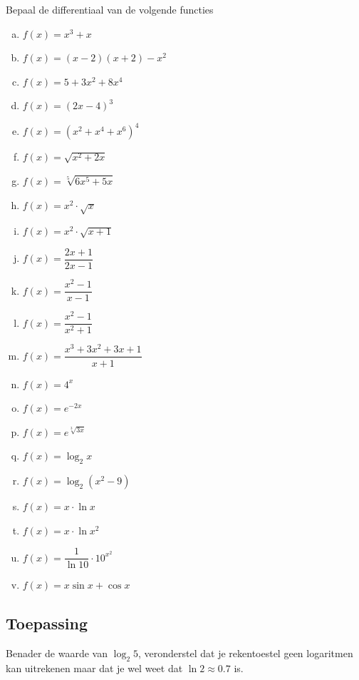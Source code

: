 \documentclass[a4paper,12pt, twoside]{article}
\begin{document}
\begin{oefening}
Bepaal de differentiaal van de volgende functies
\begin{multicols}{2}
\begin{enumerate}[(a)]
  \itemsep.5em
  \item $\displaystyle f(x)=x^3+x$
  \item $\displaystyle f(x)=(x-2)(x+2)-x^2$
  \item $\displaystyle f(x)=5+3x^2+8x^4$
  \item $\displaystyle f(x)=\left(2x-4\right)^3$
  \item $\displaystyle f(x)=\left(x^2+x^4+x^6\right)^4$
  \item $\displaystyle f(x)=\sqrt{x^2+2x}$
  \item $\displaystyle f(x)=\sqrt[5]{6x^5+5x}$
  \item $\displaystyle f(x)=x^2\cdot\sqrt{x}$
  \item $\displaystyle f(x)=x^2\cdot\sqrt{x+1}$
  \item $\displaystyle f(x)=\dfrac{2x+1}{2x-1}$
  \item $\displaystyle f(x)=\dfrac{x^2-1}{x-1}$
  \item $\displaystyle f(x)=\dfrac{x^2-1}{x^2+1}$
  \item $\displaystyle f(x)=\dfrac{x^3+3x^2+3x+1}{x+1}$
  \item $\displaystyle f(x)=4^{x}$
  \item $\displaystyle f(x)=e^{-2x}$
  \item $\displaystyle f(x)=e^{\sqrt[3]{3x}}$
  \item $\displaystyle f(x)=\log_2 x$
  \item $\displaystyle f(x)=\log_2 (x^2-9)$
  \item $\displaystyle f(x)=x\cdot \ln x$
  \item $\displaystyle f(x)=x\cdot \ln x^2$
  \item $\displaystyle f(x)=\dfrac{1}{\ln 10}\cdot 10^{x^2}$
  \item $\displaystyle f(x)=x\sin x + \cos x$
\end{enumerate}
\end{multicols}
\end{oefening}

\subsection{Toepassing}

Benader de waarde van $\log_2 5$, veronderstel dat je rekentoestel geen logaritmen kan uitrekenen maar dat je wel weet dat $\ln 2 \approx 0.7$ is.
\end{document}
